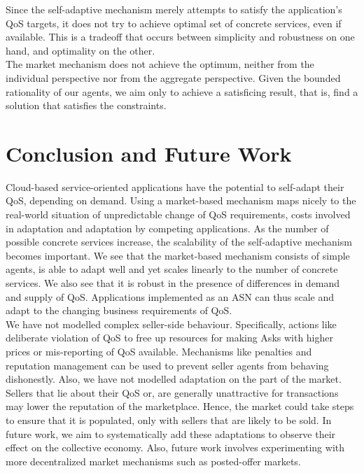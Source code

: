 \documentclass[10pt,journal,compsoc]{IEEEtran}
\begin{document}
Since the self-adaptive mechanism merely attempts to satisfy the application's QoS targets, it does not try to achieve  optimal set of concrete services, even if available. This is a tradeoff that occurs between simplicity and robustness on one hand, and optimality on the other.\\


The market mechanism does not achieve the optimum, neither from the individual perspective nor from the aggregate perspective. Given the bounded rationality of our agents, we aim only to achieve a satisficing result, that is, find a solution that satisfies the constraints. 

\section{Conclusion and Future Work}
Cloud-based service-oriented applications have the potential to self-adapt their QoS, depending on demand. Using a market-based mechanism maps nicely to the real-world situation of unpredictable change of QoS requirements, costs involved in adaptation and adaptation by competing applications. As the number of possible concrete services increase, the scalability of the self-adaptive mechanism becomes important. We see that the market-based mechanism consists of simple agents, is able to adapt well and yet scales linearly to the number of concrete services. We also see that it is robust in the presence of differences in demand and supply of QoS. Applications implemented as an ASN can thus scale and adapt to the changing business requirements of QoS.\\
We have not modelled complex seller-side behaviour. Specifically, actions like deliberate violation of QoS to free up resources for making Asks with higher prices or mis-reporting of QoS available. Mechanisms like penalties and reputation management can be used to prevent seller agents from behaving dishonestly. Also, we have not modelled adaptation on the part of the market. Sellers that lie about their QoS or, are generally unattractive for transactions may lower the reputation of the marketplace. Hence, the market could take steps to ensure that it is populated, only with sellers that are likely to be sold. In future work, we aim to systematically add these adaptations to observe their effect on the collective economy. Also, future work involves experimenting with more decentralized market mechanisms such as posted-offer markets.\\
  
\end{document}
